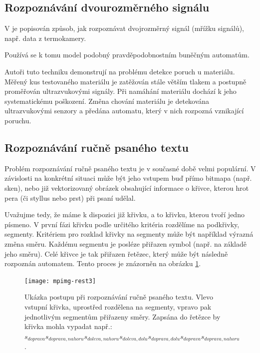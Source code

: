 \subsection{Rozpoznávání dvourozměrného signálu}
V \cite{Jin+-WavBasFeaExtUsPrFiStAuPatCla} je popisován způsob, jak rozpoznávat dvojrozměrný signál (mřížku signálů), např. data z termokamery.

Používá se k tomu model podobný pravděpodobnostním buněčným automatům. 

Autoři tuto techniku demonstrují na problému detekce poruch u materiálu. Měřený kus testovaného materiálu je zatěžován stále větším tlakem a postupně proměřován ultrazvukovými signály. Při namáhání materiálu dochází k jeho systematickému poškození. Změna chování materiálu je detekována ultrazvukovými senzory a předána automatu, který v nich rozpozná vznikající poruchu.

\subsection{Rozpoznávání ručně psaného textu} \label{subs:RecHandWrit}
Problém rozpoznávání ručně psaného textu je v současné době velmi populární. V závislosti na konkrétní situaci může být jeho vstupem buď přímo bitmapa (např. sken), nebo již vektorizovaný obrázek obsahující informace o křivce, kterou hrot pera (či styllus nebo prst) při psaní udělal.

Uvažujme tedy, že máme k dispozici již křivku, a to křivku, kterou tvoří jedno písmeno. V první fázi křivku podle určitého kritéria rozdělíme na podkřivky, segmenty. Kritériem pro rozklad křivky na segmenty může být například výrazná změna směru. Každému segmentu je posléze přiřazen symbol (např. na základě jeho směru). Celé křivce je tak přiřazen řetězec, který může být následně rozpoznán automatem. Tento proces je znázorněn na obrázku \ref{img:HandWritEx}.

\begin{figure}
 \texttt{[image: mpimg-rest3]}
 
 \caption[Ukázka postupu při rozpoznávání ručně psaného textu]{Ukázka postupu při rozpoznávání ručně psaného textu. Vlevo vstupní křivka, uprostřed rozdělena na segmenty, vpravo pak jednotlivým segmentům přiřazeny směry. Zapsána do řetězce by křivka mohla vypadat např.: $s_{doprava} s_{doprava,nahoru} s_{doleva,nahoru} s_{doleva,dolu} s_{doprava,dolu} s_{doprava} s_{doprava,nahoru}$.}
 \label{img:HandWritEx}
\end{figure}

